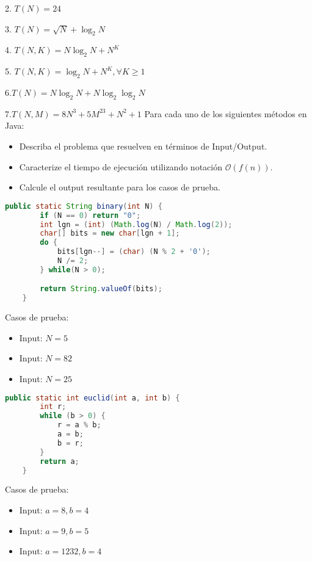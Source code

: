 \documentclass[12pt]{article}
\begin{document}
2. $T(N) = 24$
\newline\hspace{0.5cm}

3. $T(N) = \sqrt{N} + \log_2 N$
\newline\hspace{0.5cm}

4. $T(N, K) = N \log_2 N + N ^ K$
\newline\hspace{0.5cm}

5. $T(N, K) = \log_2 N + N ^ K,  \forall K \geq 1$
\newline\hspace{0.5cm}

6.$T(N) = N \log_2 N + N \log_2 \log_2 N$
\newline\hspace{0.5cm}

7.$T(N, M) = 8 N^3 + 5 M^23 + N^2 + 1$
\newpage
{}
Para cada uno de los siguientes métodos en Java:
\begin{itemize}
    \item Describa el problema que resuelven en términos de Input/Output.
    \item Caracterize el tiempo de ejecución utilizando notación $\mathcal{O}(f(n))$.
    \item Calcule el output resultante para los casos de prueba.
\end{itemize}
\begin{lstlisting}[language=Java]
    public static String binary(int N) {
        if (N == 0) return "0";
        int lgn = (int) (Math.log(N) / Math.log(2));
        char[] bits = new char[lgn + 1];
        do {
            bits[lgn--] = (char) (N % 2 + '0');
            N /= 2;
        } while(N > 0);

        return String.valueOf(bits);
    }
\end{lstlisting}
Casos de prueba:
\begin{itemize}
    \item Input: $N = 5$
    \item Input: $N = 82$
    \item Input: $N = 25$
\end{itemize}

\begin{lstlisting}[language=Java]
    public static int euclid(int a, int b) {
        int r;
        while (b > 0) {
            r = a % b;
            a = b;
            b = r;
        }
        return a;
    }
\end{lstlisting}
Casos de prueba:
\begin{itemize}
    \item Input: $a = 8, b = 4$
    \item Input: $a = 9, b = 5$
    \item Input: $a = 1232, b = 4$
\end{itemize}
\end{document}
